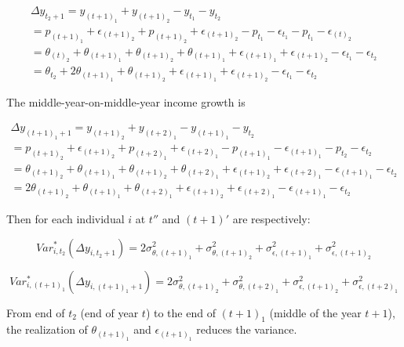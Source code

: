 \documentclass[12pt,notitlepage,onecolumn,aps,pra]{revtex4-1}
\begin{document}
\begin{equation}
\begin{split}
\Delta y_{t_2+1} = y_{(t+1)_1}+ y_{(t+1)_2} - y_{t_1 } - y_{t_2}  \\
 = p_{(t+1)_1} + \epsilon_{(t+1)_2} + p_{(t+1)_2} + \epsilon_{(t+1)_2} - p_{t_1} - \epsilon_{t_1} - p_{t_1} - \epsilon_{(t)_2 } \\
 = \theta_{(t)_2} + \theta_{(t+1)_1} + \theta_{(t+1)_2} + \theta_{(t+1)_1} + \epsilon_{(t+1)_1} + \epsilon_{(t+1)_2} - \epsilon_{t_1} - \epsilon_{t_2} \\
 =  \theta_{t_2} + 2\theta_{(t+1)_1} + \theta_{(t+1)_2} + \epsilon_{(t+1)_1} + \epsilon_{(t+1)_2} - \epsilon_{t_1} - \epsilon_{t_2} 
\end{split}
\end{equation}

The middle-year-on-middle-year income growth is

\begin{equation}
\begin{split}
\Delta y_{(t+1)_1+1} = y_{(t+1)_2}+ y_{(t+2)_1} - y_{(t+1)_1} - y_{t_2}  \\
 = p_{(t+1)_2} + \epsilon_{(t+1)_2} + p_{(t+2)_1} + \epsilon_{(t+2)_1} - p_{(t+1)_1} - \epsilon_{(t+1)_1} - p_{t_2} - \epsilon_{t_2 } \\
 = \theta_{(t+1)_2} + \theta_{(t+1)_1} + \theta_{(t+1)_2} + \theta_{(t+2)_1} + \epsilon_{(t+1)_2} + \epsilon_{(t+2)_1} - \epsilon_{(t+1)_1} - \epsilon_{t_2 } \\
 = 2\theta_{(t+1)_2} + \theta_{(t+1)_1} + \theta_{(t+2)_1} + \epsilon_{(t+1)_2} + \epsilon_{(t+2)_1} - \epsilon_{(t+1)_1} - \epsilon_{t_2 }
\end{split}
\end{equation}

Then for each individual \(i\) at \(t''\) and \((t+1)'\) are
respectively:

\begin{equation}
Var^*_{i,t_2}(\Delta y_{i,t_2+1}) =  2\sigma^2_{\theta,(t+1)_1} + \sigma^2_{\theta,(t+1)_2} + \sigma^2_{\epsilon,(t+1)_1} + \sigma^2_{\epsilon,(t+1)_2}
\end{equation}

\begin{equation}
Var^*_{i,(t+1)_1}(\Delta y_{i,(t+1)_1+1}) =  2\sigma^2_{\theta,(t+1)_2} + \sigma^2_{\theta,(t+2)_1} + \sigma^2_{\epsilon,(t+1)_2} + \sigma^2_{\epsilon,(t+2)_1}
\end{equation}

From end of \(t_2\) (end of year \(t\)) to the end of \((t+1)_1\)
(middle of the year \(t+1\)), the realization of \(\theta_{(t+1)_1}\)
and \(\epsilon_{(t+1)_1}\) reduces the variance.
\end{document}

